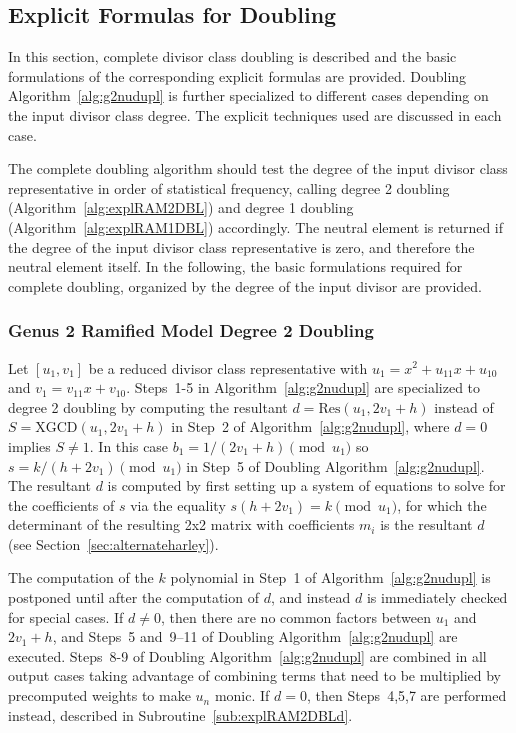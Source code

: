 \subsection{Explicit Formulas for Doubling}
\label{sec:g2RAMDBL} 
In this section, complete divisor class doubling is described and the basic
formulations of the corresponding explicit formulas are provided. Doubling
Algorithm~\ref{alg:g2nudupl} is further specialized to different cases
depending on the input divisor class degree. The explicit techniques used are
discussed in each case. 

The complete doubling algorithm should test the degree of the input divisor
class representative in order of statistical frequency, calling degree 2
doubling (Algorithm~\ref{alg:explRAM2DBL}) and degree 1 doubling
(Algorithm~\ref{alg:explRAM1DBL}) accordingly. The neutral element is returned
if the degree of the input divisor class representative is zero, and therefore
the neutral element itself.  In the following, the basic formulations required
for complete doubling, organized by the degree of the input divisor are
provided.

\subsubsection{Genus 2 Ramified Model Degree 2 Doubling}
Let $[u_1,v_1]$ be a reduced divisor class representative with $u_1 = x^2 +
u_{11}x + u_{10}$ and $v_1 = v_{11}x + v_{10}$. Steps~1-5 in
Algorithm~\ref{alg:g2nudupl} are specialized to degree 2 doubling by
computing the resultant $d = \mathrm{Res}(u_1,2v_1+h)$ instead of $S =
\mathrm{XGCD}(u_1,2v_1 + h)$ in Step~2 of Algorithm~\ref{alg:g2nudupl}, where
$d=0$ implies $S \neq 1$. In this case $b_1 = 1/(2v_1 + h) \pmod{u_1}$ so $s
= k/(h + 2v_1) \pmod{u_1}$ in Step~5 of Doubling Algorithm~\ref{alg:g2nudupl}.
The resultant $d$ is computed by first setting up a system of equations to solve
for the coefficients of $s$ via the equality $s(h + 2v_1) = k \pmod{u_1}$, for
which the determinant of the resulting 2x2 matrix with coefficients $m_i$ is the
resultant $d$ (see Section~\ref{sec:alternateharley}).

The computation of the $k$ polynomial in Step~1 of Algorithm~\ref{alg:g2nudupl}
is postponed until after the computation of $d$, and instead $d$ is immediately
checked for special cases. If $d \neq 0$, then there are no common factors
between $u_1$ and $2v_1 + h$, and Steps~5 and~9--11 of Doubling
Algorithm~\ref{alg:g2nudupl} are executed. Steps~8-9 of Doubling
Algorithm~\ref{alg:g2nudupl} are combined in all output cases taking advantage
of combining terms that need to be multiplied by precomputed weights to make
$u_n$ monic. If $d = 0$, then Steps~4,5,7 are performed instead, described in
Subroutine~\ref{sub:explRAM2DBLd}. 

